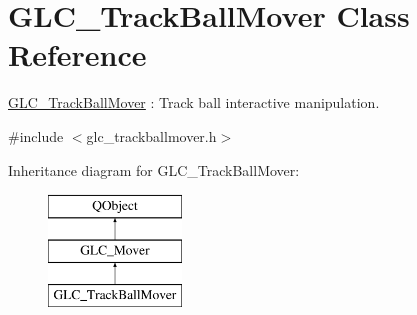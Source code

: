 \hypertarget{class_g_l_c___track_ball_mover}{\section{G\-L\-C\-\_\-\-Track\-Ball\-Mover Class Reference}
\label{class_g_l_c___track_ball_mover}
}


\hyperlink{class_g_l_c___track_ball_mover}{G\-L\-C\-\_\-\-Track\-Ball\-Mover} \-: Track ball interactive manipulation.  




{\ttfamily \#include $<$glc\-\_\-trackballmover.\-h$>$}

Inheritance diagram for G\-L\-C\-\_\-\-Track\-Ball\-Mover\-:\begin{figure}[H]
\begin{center}
\leavevmode
\includegraphics[height=3.000000cm]{class_g_l_c___track_ball_mover}
\end{center}
\end{figure}
